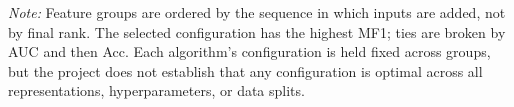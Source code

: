 \documentclass[12pt,a4paper]{article}
\begin{document}
\noindent\textit{Note:} Feature groups are ordered by the sequence in which inputs are added, not by
final rank. The selected configuration has the highest MF1; ties are broken by AUC and then Acc.
Each algorithm's configuration is held fixed across groups, but the project does not establish that
any configuration is optimal across all representations, hyperparameters, or data splits.
\end{document}

